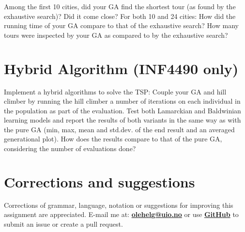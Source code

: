 \documentclass{article}           %
\begin{document}
Among the first 10 cities, did your GA find the shortest tour (as found by the
exhaustive search)? Did it come close? For both 10 and 24 cities: How did the
running time of your GA compare to that of the exhaustive search? How many
tours were inspected by your GA as compared to by the exhaustive search?

\section*{Hybrid Algorithm (INF4490 only)}
Implement a hybrid algorithms to solve the TSP: Couple your GA and hill
climber by running the hill climber a number of iterations on each individual
in the population as part of the evaluation. Test both Lamarckian and
Baldwinian learning models and report the results of both variants in the same
way as with the pure GA (min, max, mean and std.dev. of the end result and an
averaged generational plot). How does the results compare to that of the pure
GA, considering the number of evaluations done?

\section*{Corrections and suggestions}
Corrections of grammar, language, notation or suggestions for improving this assignment are appreciated.
E-mail me at: \href{mailto:olehelg@uio.no}{\textbf{olehelg@uio.no}} or use
\href{https://github.com/olehermanse/INF3490-AI_Machine_Learning}{\textbf{GitHub}}
to submit an issue or create a pull request.
\end{document}
